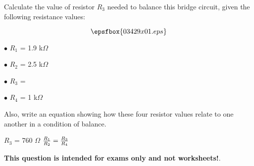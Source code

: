 

Calculate the value of resistor $R_3$ needed to balance this bridge circuit, given the following resistance values:

$$\epsfbox{03429x01.eps}$$

\medskip
\item{$\bullet$} $R_1$ = 1.9 k$\Omega$
\vskip 5pt
\item{$\bullet$} $R_2$ = 2.5 k$\Omega$
\vskip 5pt
\item{$\bullet$} $R_3$ = 
\vskip 5pt
\item{$\bullet$} $R_4$ = 1 k$\Omega$
\medskip

Also, write an equation showing how these four resistor values relate to one another in a condition of balance.







$R_3$ = 760 $\Omega$ \hskip 100pt ${R_1 \over R_2} = {R_3 \over R_4}$







{\bf This question is intended for exams only and not worksheets!}.



